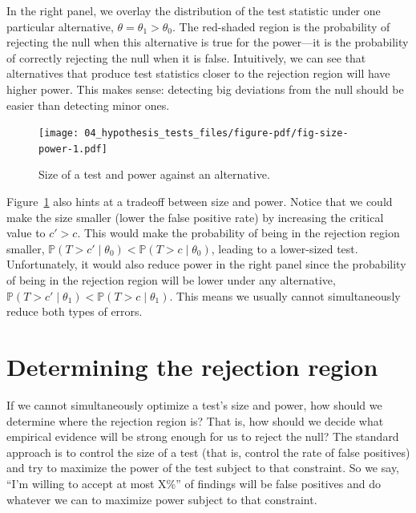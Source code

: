\documentclass[
  letterpaper,
  DIV=11,
  numbers=noendperiod]{scrreprt}
\renewcommand{\P}{\mathbb{P}}
\theoremstyle{definition}
\theoremstyle{definition}
\theoremstyle{plain}
\theoremstyle{remark}
\begin{document}
In the right panel, we overlay the distribution of the test statistic
under one particular alternative, \(\theta = \theta_1 > \theta_0\). The
red-shaded region is the probability of rejecting the null when this
alternative is true for the power---it is the probability of correctly
rejecting the null when it is false. Intuitively, we can see that
alternatives that produce test statistics closer to the rejection region
will have higher power. This makes sense: detecting big deviations from
the null should be easier than detecting minor ones.

\begin{figure}

{\centering \texttt{[image: 04\_hypothesis\_tests\_files/figure-pdf/fig-size-power-1.pdf]}

}

\caption{\label{fig-size-power}Size of a test and power against an
alternative.}

\end{figure}

Figure~\ref{fig-size-power} also hints at a tradeoff between size and
power. Notice that we could make the size smaller (lower the false
positive rate) by increasing the critical value to \(c' > c\). This
would make the probability of being in the rejection region smaller,
\(\P(T > c' \mid \theta_0) < \P(T > c \mid \theta_0)\), leading to a
lower-sized test. Unfortunately, it would also reduce power in the right
panel since the probability of being in the rejection region will be
lower under any alternative,
\(\P(T > c' \mid \theta_1) < \P(T > c \mid \theta_1)\). This means we
usually cannot simultaneously reduce both types of errors.

\hypertarget{determining-the-rejection-region}{%
\section{Determining the rejection
region}\label{determining-the-rejection-region}}

If we cannot simultaneously optimize a test's size and power, how should
we determine where the rejection region is? That is, how should we
decide what empirical evidence will be strong enough for us to reject
the null? The standard approach is to control the size of a test (that
is, control the rate of false positives) and try to maximize the power
of the test subject to that constraint. So we say, ``I'm willing to
accept at most X\%'' of findings will be false positives and do whatever
we can to maximize power subject to that constraint.
\end{document}

